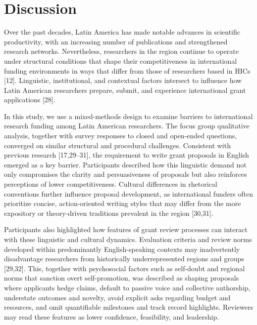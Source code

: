 \documentclass[
  letterpaper,
  DIV=11,
  numbers=noendperiod]{scrartcl}
\begin{document}
\section{Discussion}\label{discussion}

Over the past decades, Latin America has made notable advances in
scientific productivity, with an increasing number of publications and
strengthened research networks. Nevertheless, researchers in the region
continue to operate under structural conditions that shape their
competitiveness in international funding environments in ways that
differ from those of researchers based in HICs {[}12{]}. Linguistic,
institutional, and contextual factors intersect to influence how Latin
American researchers prepare, submit, and experience international grant
applications {[}28{]}.

In this study, we use a mixed-methods design to examine barriers to
international research funding among Latin American researchers. The
focus group qualitative analysis, together with survey responses to
closed and open-ended questions, converged on similar structural and
procedural challenges. Consistent with previous research
{[}17,29--31{]}, the requirement to write grant proposals in English
emerged as a key barrier. Participants described how this linguistic
demand not only compromises the clarity and persuasiveness of proposals
but also reinforces perceptions of lower competitiveness. Cultural
differences in rhetorical conventions further influence proposal
development, as international funders often prioritize concise,
action-oriented writing styles that may differ from the more expository
or theory-driven traditions prevalent in the region {[}30,31{]}.

Participants also highlighted how features of grant review processes can
interact with these linguistic and cultural dynamics. Evaluation
criteria and review norms developed within predominantly
English-speaking contexts may inadvertently disadvantage researchers
from historically underrepresented regions and groups {[}29,32{]}. This,
together with psychosocial factors such as self-doubt and regional norms
that sanction overt self-promotion, was described as shaping proposals
where applicants hedge claims, default to passive voice and collective
authorship, understate outcomes and novelty, avoid explicit asks
regarding budget and resources, and omit quantifiable milestones and
track record highlights. Reviewers may read these features as lower
confidence, feasibility, and leadership.
\end{document}
